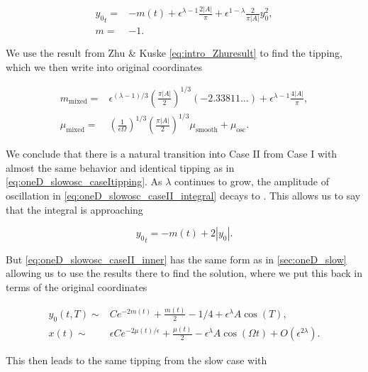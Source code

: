 \begin{equation}\label{eq:oneD_slowosc_caseII_taylor}
\begin{aligned}
{y_0}_t=&-m(t)+\epsilon^{\lambda-1}\frac{2|A|}{\pi}+\epsilon^{1-\lambda}\frac{2}{\pi |A|}y_0^2,\\
m=&-1.
\end{aligned}
\end{equation}

We use the result from Zhu \& Kuske \eqref{eq:intro_Zhuresult} to find the tipping, which we then write into original coordinates

\begin{equation*}
\begin{aligned}
m_{\text{mixed}}=&\epsilon^{(\lambda-1)/3}\left(\frac{\pi |A|}{2}\right)^{1/3}(-2.33811\ldots)+\epsilon^{\lambda-1}\frac{4|A|}{\pi},\\
\mu_{\text{mixed}}=&\left(\frac{1}{\epsilon\Omega}\right)^{1/3}\left(\frac{\pi |A|}{2}\right)^{1/3} \mu_{\text{smooth}}+\mu_{\text{osc}}.
\end{aligned}
\end{equation*}

We conclude that there is a natural transition into Case II from Case I with almost the same behavior and identical tipping as in \eqref{eq:oneD_slowosc_caseItipping}. As $\lambda$ continues to grow, the amplitude of oscillation in \eqref{eq:oneD_slowosc_caseII_integral} decays to . This allows us to say that the integral is approaching

\begin{equation}\label{eq:oneD_slowosc_caseII_inner}
{y_0}_t = -m(t) +2|y_0|.
\end{equation}

But \eqref{eq:oneD_slowosc_caseII_inner} has the same form as in \autoref{sec:oneD_slow} allowing us to use the results there to find the solution, where we put this back in terms of the original coordinates

\begin{equation}\label{eq:oneD_slowosc_caseIIsoln}
\begin{aligned}
y_0(t,T)\sim& C e^{-2m(t)}+\frac{m(t)}{2}-1/4 +\epsilon^\lambda A\cos(T),\\
x(t)\sim& \epsilon C e^{-2\mu(t)/\epsilon}+\frac{\mu(t)}{2} -\epsilon^\lambda A\cos(\Omega t)+O(\epsilon^{2\lambda}).
\end{aligned}
\end{equation}

This then leads to the same tipping from the slow case with 

